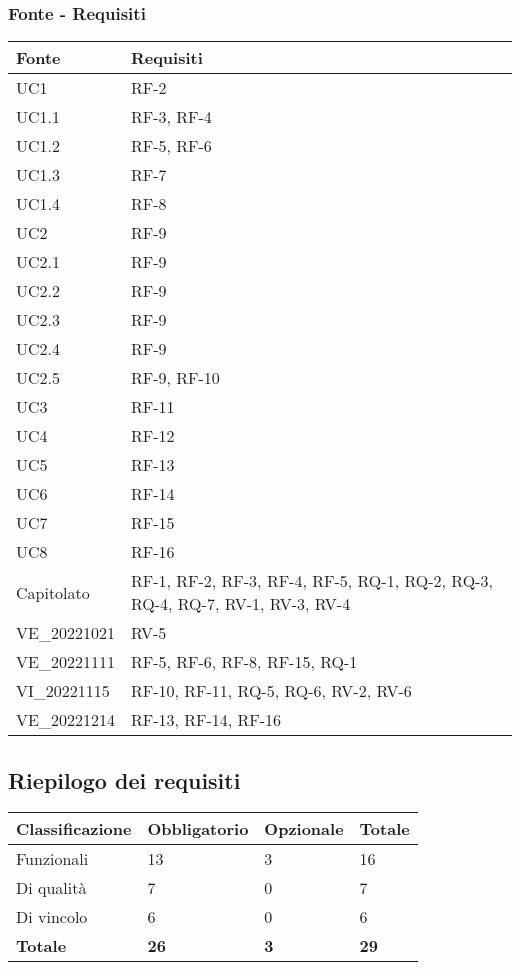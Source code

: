 \subsubsection{Fonte - Requisiti}
\begin{table}[H]
	\centering
	\begin{tabular}{| p{} | p{} |} 
 \hline
 \textbf{Fonte} & \textbf{Requisiti} \\
 \hline
	UC1 & RF-2\\
\hline
	UC1.1 & RF-3, RF-4\\
\hline
	UC1.2 & RF-5, RF-6\\
\hline
	UC1.3 & RF-7\\
\hline
	UC1.4 & RF-8\\
\hline
	UC2 & RF-9\\
 \hline
	UC2.1 & RF-9\\
 \hline
	UC2.2 & RF-9\\
  \hline
	UC2.3 & RF-9\\
  \hline
	UC2.4 & RF-9\\
  \hline
	UC2.5 & RF-9, RF-10\\
\hline
	UC3 & RF-11\\ 
\hline
	UC4 & RF-12\\
 \hline
	UC5 & RF-13\\
 \hline
	UC6 & RF-14\\
 \hline
	UC7 & RF-15\\
 \hline
	UC8 & RF-16\\
\hline
	Capitolato & RF-1, RF-2, RF-3, RF-4, RF-5, RQ-1, RQ-2, RQ-3, RQ-4, RQ-7, RV-1, RV-3, RV-4\\
 \hline
	VE\_20221021 & RV-5\\
\hline
	VE\_20221111 & RF-5, RF-6, RF-8, RF-15, RQ-1\\
\hline
	VI\_20221115 & RF-10, RF-11, RQ-5, RQ-6, RV-2, RV-6\\
 \hline
	VE\_20221214 & RF-13, RF-14, RF-16\\
\hline
	\end{tabular}
\end{table}

\subsection{Riepilogo dei requisiti}

\begin{table}[h]
	\centering
	\begin{tabular}{| p{} | p{} | p{} | p{} |} 
		\hline
		\textbf{Classificazione} & \textbf{Obbligatorio} & \textbf{Opzionale} & \textbf{Totale} \\
		\hline
		Funzionali & 13 & 3 & 16\\
		\hline
		Di qualità & 7 & 0 & 7\\
		\hline
		Di vincolo & 6 & 0 & 6\\
		\hline
		\textbf{Totale} & \textbf{26} &\textbf {3} &  \textbf{29}\\
		\hline
	\end{tabular}
\end{table}
